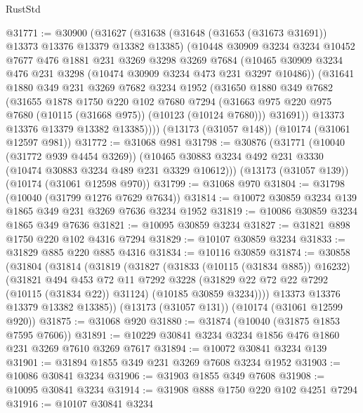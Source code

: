 \begin{lexlean}{RustStd}
\begin{coremodule}
@31771 := @30900
    (@31627
      (@31638
        (@31648 (@31653 (@31673 @31691)) @13373 @13376 @13379 @13382 @13385)
        (@10448
          @30909
          @3234
          @3234
          @10452
          @7677
          @476
          @1881
          @231
          @3269
          @3298
          @3269
          @7684
          (@10465 @30909 @3234 @476 @231 @3298 (@10474 @30909 @3234 @473 @231 @3297 @10486))
          (@31641
            @1880
            @349
            @231
            @3269
            @7682
            @3234
            @1952
            (@31650
              @1880
              @349
              @7682
              (@31655
                @1878
                @1750
                @220
                @102
                @7680
                @7294
                (@31663 @975 @220 @975 @7680 (@10115 (@31668 @975)) (@10123 (@10124 @7680)))
                @31691))
            @13373
            @13376
            @13379
            @13382
            @13385))))
    (@13173 (@31057 @148))
    (@10174 (@31061 @12597 @981))
@31772 := @31068 @981
@31798 := @30876
    (@31771
      (@10040 (@31772 @939 @4454 @3269))
      (@10465 @30883 @3234 @492 @231 @3330 (@10474 @30883 @3234 @489 @231 @3329 @10612)))
    (@13173 (@31057 @139))
    (@10174 (@31061 @12598 @970))
@31799 := @31068 @970
@31804 := @31798 (@10040 (@31799 @1276 @7629 @7634))
@31814 := @10072 @30859 @3234 @139 @1865 @349 @231 @3269 @7636 @3234 @1952
@31819 := @10086 @30859 @3234 @1865 @349 @7636
@31821 := @10095 @30859 @3234
@31827 := @31821 @898 @1750 @220 @102 @4316 @7294
@31829 := @10107 @30859 @3234
@31833 := @31829 @885 @220 @885 @4316
@31834 := @10116 @30859
@31874 := @30858
    (@31804
      (@31814
        (@31819
          (@31827
            (@31833 (@10115 (@31834 @885)) @16232)
            (@31821
              @494
              @453
              @72
              @11
              @7292
              @3228
              (@31829 @22 @72 @22 @7292 (@10115 (@31834 @22)) @31124)
              (@10185 @30859 @3234))))
        @13373
        @13376
        @13379
        @13382
        @13385))
    (@13173 (@31057 @131))
    (@10174 (@31061 @12599 @920))
@31875 := @31068 @920
@31880 := @31874 (@10040 (@31875 @1853 @7595 @7606))
@31891 := @10229 @30841 @3234 @3234 @1856 @476 @1860 @231 @3269 @7610 @3269 @7617
@31894 := @10072 @30841 @3234 @139
@31901 := @31894 @1855 @349 @231 @3269 @7608 @3234 @1952
@31903 := @10086 @30841 @3234
@31906 := @31903 @1855 @349 @7608
@31908 := @10095 @30841 @3234
@31914 := @31908 @888 @1750 @220 @102 @4251 @7294
@31916 := @10107 @30841 @3234

\end{coremodule}
\end{lexlean}
